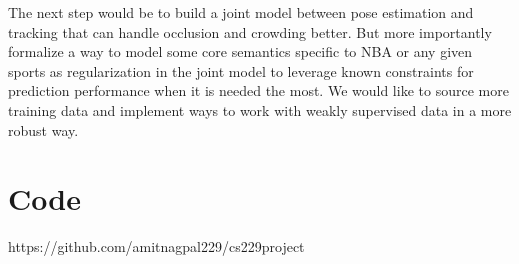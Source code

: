 \documentclass{article}
\begin{document}
The next step would be to build a joint model between pose estimation and tracking that can handle occlusion and crowding better. But more importantly formalize a way to model some core semantics specific to NBA or any given sports as regularization in the joint model to leverage known constraints for prediction performance when it is needed the most. We would like to source more training data and implement ways to work with weakly supervised data in a more robust way. 

\section{Code}
\label{code}
https://github.com/amitnagpal229/cs229project 

\nocite{langley00}



\end{document}
